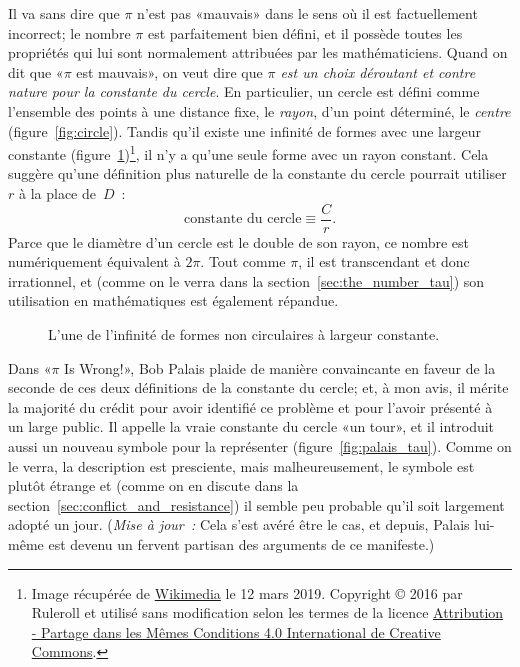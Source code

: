 Il va sans dire que $\pi$ n'est pas «\ns mauvais\ns » dans le sens où il
est factuellement incorrect\ns; le nombre $\pi$ est parfaitement bien défini,
et il possède toutes les propriétés qui lui sont normalement attribuées par
les mathématiciens. Quand on dit que «\ns $\pi$ est mauvais\ns », on veut dire que
\emph{$\pi$ est un choix déroutant et contre nature pour la constante du
cercle}. En particulier, un cercle est défini comme l'ensemble des points à
une distance fixe, le \emph{rayon}, d'un point déterminé, le \emph{centre} (figure~\ref{fig:circle}).
Tandis qu'il existe une infinité de formes avec une
largeur constante (figure~\ref{fig:constant_width})\ns\footnote{Image
récupérée de
\href{https://commons.wikimedia.org/wiki/File:Reuleaux_triangle_roll.gif}{Wikimedia}
le 12 mars 2019. Copyright © 2016 par Ruleroll et utilisé sans
modification selon les termes de la licence
\href{https://creativecommons.org/licenses/by-sa/4.0/deed.fr}{Attribution -
Partage dans les Mêmes Conditions 4.0 International de Creative Commons}.}, il
n'y a qu'une seule forme avec un rayon constant. Cela suggère qu'une
définition plus naturelle de la constante du cercle pourrait utiliser $r$ à la
place de~$D$~:
\begin{equation}
\label{eq:circle_constant}
\mbox{constante du cercle} \equiv \frac{C}{r}.
\end{equation}
Parce que le diamètre d'un cercle est le double de son rayon, ce nombre est
numériquement équivalent à $2\pi$. Tout comme $\pi$, il est transcendant et donc
irrationnel, et (comme on le verra dans la section~\ref{sec:the_number_tau})
son utilisation en mathématiques est également répandue.

\begin{figure}
\caption{L'une de l'infinité de formes non circulaires à largeur
constante.\label{fig:constant_width}}
\end{figure}

Dans «\ns $\pi$ Is Wrong!\ns », Bob Palais plaide de manière convaincante en faveur
de la seconde de ces deux définitions de la constante du cercle\ns; et, à mon
avis, il mérite la majorité du crédit pour avoir identifié ce problème et pour
l'avoir présenté à un large public. Il appelle la vraie constante du cercle «\ns un
tour\ns », et il introduit aussi un nouveau symbole pour la représenter
(figure~\ref{fig:palais_tau}). Comme on le verra, la description est presciente,
mais malheureusement, le symbole est plutôt étrange et (comme on en discute dans la
section~\ref{sec:conflict_and_resistance}) il semble peu probable qu'il soit
largement adopté un jour. (\emph{Mise à jour~:} Cela s'est avéré être le cas,
et depuis, Palais lui-même est devenu un fervent partisan des arguments de
ce manifeste.)

